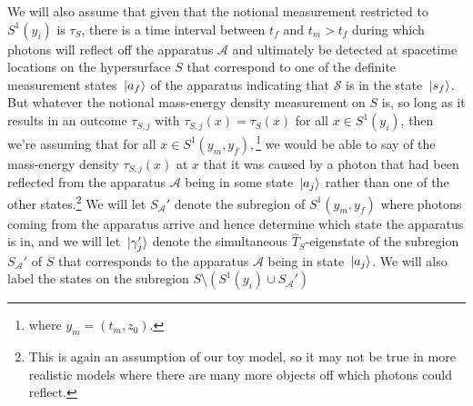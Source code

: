 We will also assume that given that the notional measurement restricted to $S^1(y_i)$ is $\tau_S$, there is a time interval between $t_f$ and $t_m > t_f$  %
%
 during which photons will reflect off the apparatus $\mathcal{A}$ and ultimately be detected at spacetime locations on the hypersurface $S$ that correspond to one of the definite measurement states $\ket*{a_f}$ %
%
 of the apparatus indicating that $\mathcal{S}$ is in the state $\ket*{s_f}$. %
 But whatever the  notional mass-energy density measurement on $S$ is, so long as it results in an outcome $\tau_{S,j}$ with $\tau_{S,j}(x)=\tau_S(x)$ for all $x\in S^1(y_i)$, then we're assuming that for all $x \in S^1(y_m,y_f),$\footnote{where $y_m=(t_m, z_0)$.} we would be able to say of the mass-energy density $\tau_{S,j}(x)$ at $x$ that it was caused by a photon that had been reflected from the apparatus $\mathcal{A}$ being in some state $\ket*{a_j}$ rather than one of the other states.\footnote{This is again an assumption of our toy model, so it may not be true in more realistic models where there are many more objects off which photons could reflect.} We will let $S_{\mathcal{A}}'$ %
  denote the subregion of $S^1(y_m,y_f)$ where photons coming from the apparatus arrive and hence determine which state the apparatus  is in, and we will let $\ket*{\gamma'_j}$ %
   denote the simultaneous $\hat{T}_S$-eigenstate of the subregion $S_{\mathcal{A}}'$ of $S$ that corresponds to the apparatus $\mathcal{A}$ being in state $\ket*{a_j}$.  We will also label the states on the subregion $S\setminus (S^1(y_i)\cup S_{\mathcal{A}}')$ %
